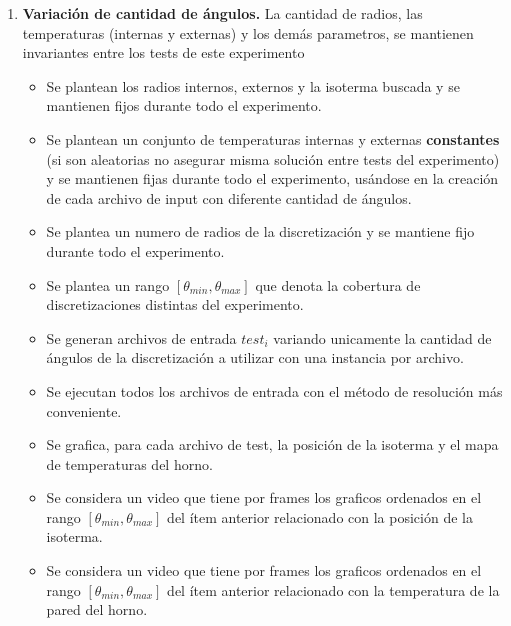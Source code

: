 \begin{enumerate}
    \item \textbf{Variación de cantidad de ángulos.} La cantidad de radios, las temperaturas (internas y externas) y los demás parametros, se mantienen invariantes entre los tests de este experimento\begin{itemize}
        \item Se plantean los radios internos, externos y la isoterma buscada y se mantienen fijos durante todo el experimento.
        \item Se plantean un conjunto de temperaturas internas y externas \textbf{constantes} (si son aleatorias no asegurar misma solución entre tests del experimento) y se mantienen fijas durante todo el experimento, usándose en la creación de cada archivo de input con diferente cantidad de ángulos.
        \item Se plantea un numero de radios de la discretización y se mantiene fijo durante todo el experimento. 
        \item Se plantea un rango $[\theta_{min}, \theta_{max}]$ que denota la cobertura de discretizaciones distintas del experimento.
        \item Se generan archivos de entrada $test_i$ variando unicamente la cantidad de ángulos de la discretización a utilizar con una instancia por archivo.
        \item Se ejecutan todos los archivos de entrada con el método de resolución más conveniente.
        \item Se grafica, para cada archivo de test, la posición de la isoterma y el mapa de temperaturas del horno.
        \item Se considera un video que tiene por frames los graficos ordenados en el rango $[\theta_{min}, \theta_{max}]$ del ítem anterior relacionado con la posición de la isoterma.
        \item Se considera un video que tiene por frames los graficos ordenados en el rango $[\theta_{min}, \theta_{max}]$ del ítem anterior relacionado con la temperatura de la pared del horno.
    \end{itemize}    


\end{enumerate}
